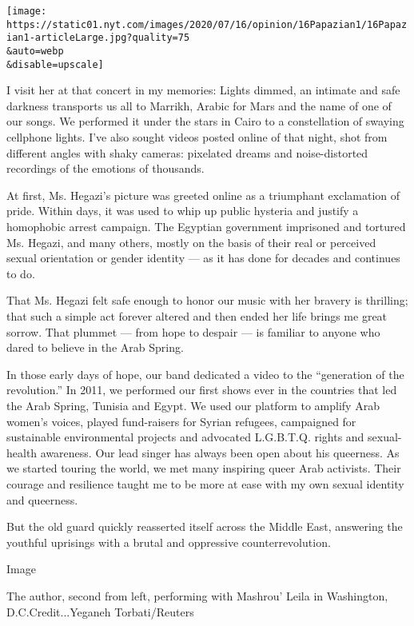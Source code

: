 \texttt{[image: https://static01.nyt.com/images/2020/07/16/opinion/16Papazian1/16Papazian1-articleLarge.jpg?quality=75\\\&auto=webp\\\&disable=upscale]}

I visit her at that concert in my memories: Lights dimmed, an intimate
and safe darkness transports us all to Marrikh, Arabic for Mars and the
name of one of our songs. We performed it under the stars in Cairo to a
constellation of swaying cellphone lights. I've also sought videos
posted online of that night, shot from different angles with shaky
cameras: pixelated dreams and noise-distorted recordings of the emotions
of thousands.

At first, Ms. Hegazi's picture was greeted online as a triumphant
exclamation of pride. Within days, it was used to whip up public
hysteria and justify a homophobic arrest campaign. The Egyptian
government imprisoned and tortured Ms. Hegazi, and many others, mostly
on the basis of their real or perceived sexual orientation or gender
identity --- as it has done for decades and continues to do.

That Ms. Hegazi felt safe enough to honor our music with her bravery is
thrilling; that such a simple act forever altered and then ended her
life brings me great sorrow. That plummet --- from hope to despair ---
is familiar to anyone who dared to believe in the Arab Spring.

In those early days of hope, our band dedicated a video to the
``generation of the revolution.'' In 2011, we performed our first shows
ever in the countries that led the Arab Spring, Tunisia and Egypt. We
used our platform to amplify Arab women's voices, played fund-raisers
for Syrian refugees, campaigned for sustainable environmental projects
and advocated L.G.B.T.Q. rights and sexual-health awareness. Our lead
singer has always been open about his queerness. As we started touring
the world, we met many inspiring queer Arab activists. Their courage and
resilience taught me to be more at ease with my own sexual identity and
queerness.

But the old guard quickly reasserted itself across the Middle East,
answering the youthful uprisings with a brutal and oppressive
counterrevolution.

Image

The author, second from left, performing with Mashrou' Leila in
Washington, D.C.Credit...Yeganeh Torbati/Reuters

